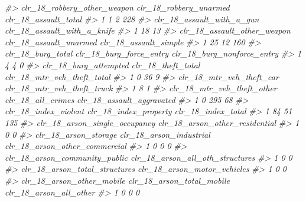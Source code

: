 \documentclass[
]{krantz}
\makeatletter
\newenvironment{Shaded}{\begin{snugshade}}{\end{snugshade}}
\newcommand{\CommentTok}[1]{\textcolor[rgb]{0.37,0.37,0.37}{\textit{#1}}}
\newenvironment{kframe}{%
\medskip{}
\setlength{\fboxsep}{.8em}
 \def\at@end@of@kframe{}%
 \ifinner\ifhmode%
  \def\at@end@of@kframe{\end{minipage}}%
  \begin{minipage}{\columnwidth}%
 \fi\fi%
 \def\FrameCommand##1{\hskip\@totalleftmargin \hskip-\fboxsep
 \colorbox{shadecolor}{##1}\hskip-\fboxsep
     \hskip-\linewidth \hskip-\@totalleftmargin \hskip\columnwidth}%
 \MakeFramed {\advance\hsize-\width
   \@totalleftmargin\z@ \linewidth\hsize
   \@setminipage}}%
 {\par\unskip\endMakeFramed%
 \at@end@of@kframe}
\renewenvironment{Shaded}{\begin{kframe}}{\end{kframe}}
\makeatother
\begin{document}
\begin{Shaded}
\begin{Highlighting}[]
\CommentTok{\#\textgreater{}   clr\_18\_robbery\_other\_weapon clr\_18\_robbery\_unarmed clr\_18\_assault\_total}
\CommentTok{\#\textgreater{} 1                           1                      2                  228}
\CommentTok{\#\textgreater{}   clr\_18\_assault\_with\_a\_gun clr\_18\_assault\_with\_a\_knife}
\CommentTok{\#\textgreater{} 1                        18                          13}
\CommentTok{\#\textgreater{}   clr\_18\_assault\_other\_weapon clr\_18\_assault\_unarmed clr\_18\_assault\_simple}
\CommentTok{\#\textgreater{} 1                          25                     12                   160}
\CommentTok{\#\textgreater{}   clr\_18\_burg\_total clr\_18\_burg\_force\_entry clr\_18\_burg\_nonforce\_entry}
\CommentTok{\#\textgreater{} 1                 4                       4                          0}
\CommentTok{\#\textgreater{}   clr\_18\_burg\_attempted clr\_18\_theft\_total clr\_18\_mtr\_veh\_theft\_total}
\CommentTok{\#\textgreater{} 1                     0                 36                          9}
\CommentTok{\#\textgreater{}   clr\_18\_mtr\_veh\_theft\_car clr\_18\_mtr\_veh\_theft\_truck}
\CommentTok{\#\textgreater{} 1                        8                          1}
\CommentTok{\#\textgreater{}   clr\_18\_mtr\_veh\_theft\_other clr\_18\_all\_crimes clr\_18\_assault\_aggravated}
\CommentTok{\#\textgreater{} 1                          0               295                        68}
\CommentTok{\#\textgreater{}   clr\_18\_index\_violent clr\_18\_index\_property clr\_18\_index\_total}
\CommentTok{\#\textgreater{} 1                   84                    51                135}
\CommentTok{\#\textgreater{}   clr\_18\_arson\_single\_occupancy clr\_18\_arson\_other\_residential}
\CommentTok{\#\textgreater{} 1                             0                              0}
\CommentTok{\#\textgreater{}   clr\_18\_arson\_storage clr\_18\_arson\_industrial clr\_18\_arson\_other\_commercial}
\CommentTok{\#\textgreater{} 1                    0                       0                             0}
\CommentTok{\#\textgreater{}   clr\_18\_arson\_community\_public clr\_18\_arson\_all\_oth\_structures}
\CommentTok{\#\textgreater{} 1                             0                               0}
\CommentTok{\#\textgreater{}   clr\_18\_arson\_total\_structures clr\_18\_arson\_motor\_vehicles}
\CommentTok{\#\textgreater{} 1                             0                           0}
\CommentTok{\#\textgreater{}   clr\_18\_arson\_other\_mobile clr\_18\_arson\_total\_mobile clr\_18\_arson\_all\_other}
\CommentTok{\#\textgreater{} 1                         0                         0                      0}

\end{Highlighting}
\end{Shaded}
\end{document}
